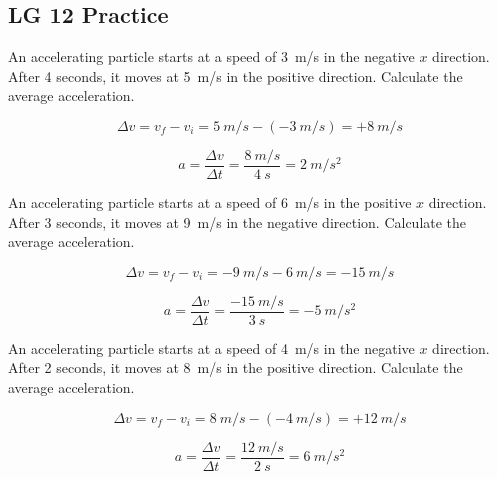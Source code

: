 \documentclass[answers]{exam}
\begin{document}
\clearpage

\subsection*{LG 12 Practice}

\begin{questions}
\question 
An accelerating particle starts at a speed of \SI{3}{m/s} in the negative $x$ direction. After 4 seconds, it moves at \SI{5}{m/s} in the positive direction. Calculate the average acceleration.

\begin{solution}
\begin{equation*}
    \Delta v = v_f - v_i = \SI{5}{m/s} - (-\SI{3}{m/s}) = +\SI{8}{m/s}
\end{equation*}

\begin{equation*}
    a = \frac{\Delta v}{\Delta t} = \frac{\SI{8}{m/s}}{\SI{4}{s}} = \boxed{\SI{2}{m/s^2}}
\end{equation*}
\end{solution}

\question
An accelerating particle starts at a speed of \SI{6}{m/s} in the positive $x$ direction. After 3 seconds, it moves at \SI{9}{m/s} in the negative direction. Calculate the average acceleration.

\begin{solution}
\begin{equation*}
    \Delta v = v_f - v_i = -\SI{9}{m/s} - \SI{6}{m/s} = -\SI{15}{m/s}
\end{equation*}

\begin{equation*}
    a = \frac{\Delta v}{\Delta t} = \frac{\SI{-15}{m/s}}{\SI{3}{s}} = \boxed{\SI{-5}{m/s^2}}
\end{equation*}
\end{solution}

\question
An accelerating particle starts at a speed of \SI{4}{m/s} in the negative $x$ direction. After 2 seconds, it moves at \SI{8}{m/s} in the positive direction. Calculate the average acceleration.

\begin{solution}
\begin{equation*}
    \Delta v = v_f - v_i = \SI{8}{m/s} - (-\SI{4}{m/s}) = +\SI{12}{m/s}
\end{equation*}

\begin{equation*}
    a = \frac{\Delta v}{\Delta t} = \frac{\SI{12}{m/s}}{\SI{2}{s}} = \boxed{\SI{6}{m/s^2}}
\end{equation*}
\end{solution}


\end{questions}
\end{document}
